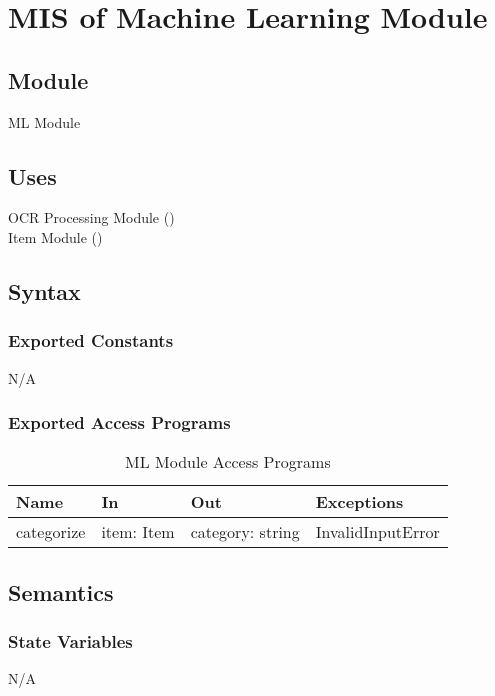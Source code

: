 \documentclass[12pt, titlepage]{article}
\begin{document}

\section{MIS of Machine Learning Module}\label{ML_Module}

\subsection{Module}
ML Module

\subsection{Uses}
OCR Processing Module ()\\
Item Module ()

\subsection{Syntax}

\subsubsection{Exported Constants}
N/A

\subsubsection{Exported Access Programs}

\begin{center}
  \begin{table}[H]
    \caption{ML Module Access Programs}
\begin{tabular}{p{4cm} p{4cm} p{4cm} p{4cm}}
\hline
\textbf{Name} & \textbf{In} & \textbf{Out} & \textbf{Exceptions} \\
\hline
categorize & item: Item & category: string & InvalidInputError \\
\hline
\end{tabular}
\end{table}
\end{center}

\subsection{Semantics}

\subsubsection{State Variables}
N/A
\end{document}
